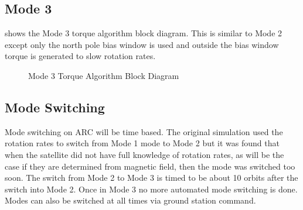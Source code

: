 \subsection{Mode 3}

 shows the Mode 3 torque algorithm block diagram. This is similar to Mode 2 except only the north pole bias window is used and outside the bias window torque is generated to slow rotation rates.

\begin{figure}[H]
    \centering
    \caption{Mode 3 Torque Algorithm Block Diagram}
    \label{fig:mode3}
\end{figure}

\subsection{Mode Switching}

Mode switching on \ac{ARC} will be time based. The original simulation used the rotation rates to switch from Mode 1 mode to Mode 2 but it was found that when the satellite did not have full knowledge of rotation rates, as will be the case if they are determined from magnetic field, then the mode was switched too soon. The switch from Mode 2 to Mode 3 is timed to be about 10 orbits after the switch into Mode 2. Once in Mode 3 no more automated mode switching is done. Modes can also be switched at all times via ground station command.

